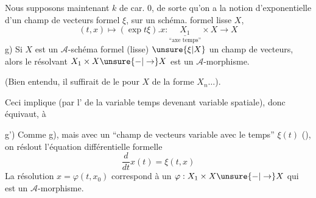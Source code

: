 Nous supposons maintenant $k$ de car. $0$, de sorte qu'on a la notion d'exponentielle d'un champ de vecteurs formel $\xi$, sur  un schéma. formel lisse $X$,
\[
(t,x)\longmapsto(\exp t\xi).x:\underset{\text{``axe temps''}}{\underline{X_1}}\times X\longrightarrow X
\]
g) Si $X$ est un $\mathcal A$-schéma formel (lisse) $\unsure{\xi|X}$ un champ de vecteurs, alors le résolvant $X_1\times X\unsure{-|\to}X$ est un $\mathcal A$-morphisme.

(Bien entendu, il suffirait de le  pour $X$ de la forme $X_n\ldots$).

Ceci implique (par l' de la variable temps devenant variable spatiale), donc équivaut, à

g') Comme g), mais avec un ``champ de vecteurs variable avec le temps'' $\xi(t)$
(), on réslout l'équation différentielle formelle
\[
\frac{d}{dt}x(t)=\xi(t,x)
\]
La résolution $x=\varphi(t,x_0)$ correspond à un $\varphi:X_1\times X\unsure{-|\to}X$ qui est un $\mathcal A$-morphisme.
